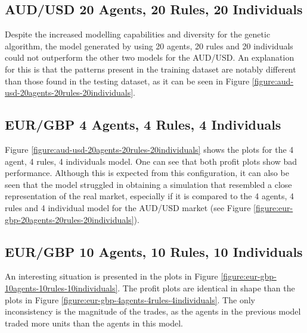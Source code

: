 \subsection{AUD/USD 20 Agents, 20 Rules, 20 Individuals}
\label{results:forecast-aud-usd-20agents-20rules-20individuals}

Despite the increased modelling capabilities and diversity for the genetic
algorithm, the model generated by using 20 agents, 20 rules and 20 individuals
could not outperform the other two models for the AUD/USD. An explanation for
this is that the patterns present in the training dataset are notably different
than those found in the testing dataset, as it can be seen in Figure
\ref{figure:aud-usd-20agents-20rules-20individuals}.







\newpage

\subsection{EUR/GBP 4 Agents, 4 Rules, 4 Individuals}
\label{results:forecast-eur-gbp-4agents-4rules-4individuals}

Figure \ref{figure:aud-usd-20agents-20rules-20individuals} shows the plots for
the 4 agent, 4 rules, 4 individuals model. One can see that both profit plots
show bad performance. Although this is expected from this configuration, it can
also be seen that the model struggled in obtaining a simulation that resembled a
close representation of the real market, especially if it is compared to the 4
agents, 4 rules and 4 individual model for the AUD/USD market (see Figure
\ref{figure:eur-gbp-20agents-20rules-20individuals}).



\newpage

\subsection{EUR/GBP 10 Agents, 10 Rules, 10 Individuals}
\label{results:forecast-eur-gbp-10agents-10rules-10individuals}

An interesting situation is presented in the plots in Figure
\ref{figure:eur-gbp-10agents-10rules-10individuals}. The profit plots are
identical in shape than the plots in Figure
\ref{figure:eur-gbp-4agents-4rules-4individuals}. The only inconsistency is the
magnitude of the trades, as the agents in the previous model traded more units
than the agents in this model.



